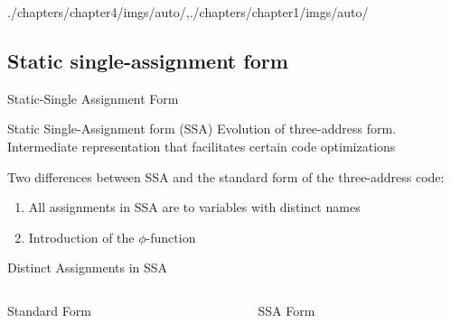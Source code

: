 \begin{graphicspathcontext}{{./chapters/chapter4/imgs/auto/},{./chapters/chapter1/imgs/auto/}}
\begin{bibunit}[apalike]
\subsection{Static single-assignment form}
\subsectiontableofcontentslide

\begin{frame}{{Static-Single Assignment} Form}
	\begin{definitionblock}{Static Single-Assignment form (SSA)}
		Evolution of three-address form. \newline
		Intermediate representation that facilitates certain code optimizations
	\end{definitionblock}
	\vspace{3em}
	Two differences between SSA and the standard form of the three-address code:
	\begin{enumerate}
	\item All assignments in SSA are to variables with distinct names
	\item Introduction of the $\phi$-function
	\end{enumerate}
\end{frame}

\begin{frame}[background=8]{{Distinct Assignments} in SSA}
	\vspace{.25cm}
	\begin{columns}
		\begin{column}{.5\linewidth}
			\begin{center}
			\begin{tac}[\linewidth]
			\end{tac}
			\vspace{1em}
			Standard Form
			\end{center}
		\end{column}
		\begin{column}{.5\linewidth}
			\begin{center}
			\begin{tac}[\linewidth]
			\end{tac}
			\vspace{1em}
			SSA Form
			\end{center}
		\end{column}
	\end{columns}
\end{frame}


\end{bibunit}
\end{graphicspathcontext}
